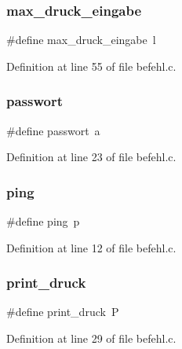\mbox{\label{befehl_8c_a9a68a03fd6447131e184b0801b7b6729}} 
\subsubsection{max\+\_\+druck\+\_\+eingabe}
{\footnotesize\ttfamily \#define max\+\_\+druck\+\_\+eingabe~\textquotesingle{}l\textquotesingle{}}



Definition at line 55 of file befehl.\+c.

\mbox{\label{befehl_8c_ada6a609998ecfca47bef369cd05b97c1}} 
\subsubsection{passwort}
{\footnotesize\ttfamily \#define passwort~\textquotesingle{}a\textquotesingle{}}



Definition at line 23 of file befehl.\+c.

\mbox{\label{befehl_8c_a893e969cd2c2a2e1c87e7aec415f867c}} 
\subsubsection{ping}
{\footnotesize\ttfamily \#define ping~\textquotesingle{}p\textquotesingle{}}



Definition at line 12 of file befehl.\+c.

\mbox{\label{befehl_8c_a614f6e5ed300b08d23c885cab1573169}} 
\subsubsection{print\+\_\+druck}
{\footnotesize\ttfamily \#define print\+\_\+druck~\textquotesingle{}P\textquotesingle{}}



Definition at line 29 of file befehl.\+c.

\mbox{\label{befehl_8c_a8979eb5fd052227a502f34eb8919be17}} 

